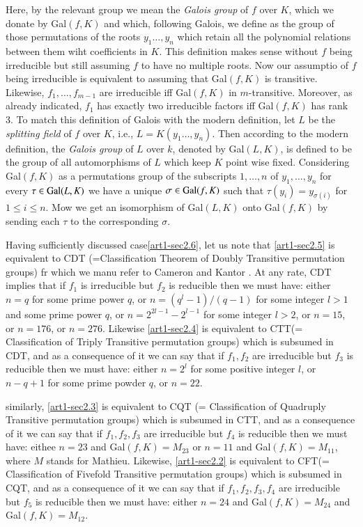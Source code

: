 Here, by the relevant group we mean the {\it Galois group} of $f$ over $K$, which we donate by Gal$(f, K)$ and which, following Galois, we define as the group of those permutations of the roots $y_{1}\ldots, y_{n}$ which retain all the polynomial relations between them wiht coefficients in $K$. This definition makes sense without $f$ being irreducible but still assuming $f$ to have no multiple roots. Now our assumptio of $f$ being irreducible is equivalent to assuming that Gal$(f, K)$ is transitive. Likewise, $f_{1}, \ldots, f_{m-1}$ are irreducible iff Gal$(f, K)$ in $m$-transitive. Moreover, as already indicated, $f_{1}$ has exactly two irreducible factors iff Gal$(f, K)$ has rank 3. To match this definition of Galois with the modern definition, let $L$ be the {\it splitting field} of $f$ over $K$, i.e., $L=K(y_{1}\ldots, y_{n})$. Then according to the modern definition, the {\it Galois group} of $L$ over $k$, denoted by Gal$(L, K)$, is defined to be the group of all automorphisms of $L$ which keep $K$  point wise fixed. Considering Gal$(f, K)$ as a permutations group of the subscripts $1,\ldots, n$ of $y_{1}, \ldots, y_{n}$ for every $\tau \in {\rm Gal}(L, K)$ we have a unique $\sigma \in {\rm Gal}(f, K)$ such that $\tau(y_{i}) = y_{\sigma(i)}$ for $1 \leq i \leq n$. Mow we get an isomorphism of Gal$(L, K)$ onto Gal$(f, K)$ by sending each $\tau$ to the corresponding $\sigma$.

Having sufficiently discussed case\ref{art1-sec2.6}, let us note that \ref{art1-sec2.5} is equivalent to CDT (=Classification Theorem of Doubly Transitive permutation groups) fr which we manu refer to Cameron \cite{art1-key22} and Kantor \cite{art1-key41}. At any rate, CDT implies that if $f_{1}$ is irreducible but $f_{2}$ is reducible then we must have: either $n=q$ for some prime power $q$, or $n=(q^{l}-1)/(q-1)$ for some integer $l>1$ and some prime power $q$, or $n=2^{2l-1}-2^{l-1}$ for some integer $l>2$, or $n=15$, or $n=176$, or $n=276$. Likewise \ref{art1-sec2.4} is equivalent to CTT(= Classification of Triply Transitive permutation groups) which is subsumed in CDT, and as a consequence of it we can say that if $f_{1}, f_{2}$ are irreducible but $f_{3}$ is reducible then we must have: either $n=2^{l}$ for some positive integer $l$, or $n-q+1$ for some prime powder $q$, or $n=22$.
       
similarly, \ref{art1-sec2.3} is equivalent to CQT (= Classification of Quadruply Transitive permutation groups) which is subsumed in CTT, and as a consequence of it we can  say that if $f_{1}, f_{2}, f_{3}$ are irreducible but $f_{4}$ is reducible then we must have: eithee $n=23$ and Gal$(f, K)=M_{23}$ or $n=11$ and Gal$(f, K)=M_{11}$, where  $M$ stands for Mathieu. Likewise, \ref{art1-sec2.2} is equivalent to CFT(= Classification of Fivefold Transitive permutation groups) which is subsumed in CQT, and as a consequence of it we can say that if $f_{1},f_{2}, f_{3}, f_{4}$ are irreducible but $f_{5}$ is reducible then we must have: either $n=24$ and Gal$(f, K)=M_{24}$ and Gal$(f, K)=M_{12}$.  

